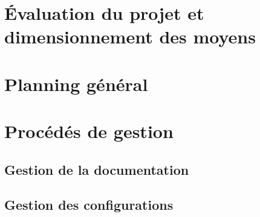 \documentclass{../../res/univ-projet}
\begin{document}
\section{\'Evaluation du projet et dimensionnement des moyens}

\section{Planning g\'en\'eral}


\section{Proc\'ed\'es de gestion}
\subsection{Gestion de la documentation}

\subsection{Gestion des configurations}

\end{document}
